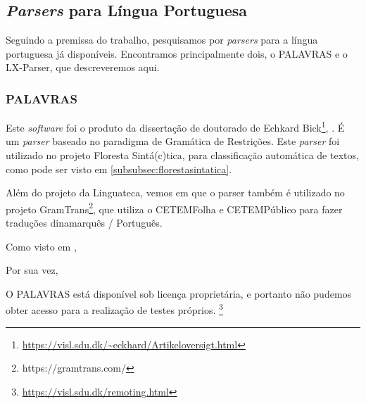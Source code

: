 \subsection{\textit{Parsers} para Língua Portuguesa}
\label{subsec:parser_portugues}
Seguindo a premissa do trabalho, pesquisamos por \textit{parsers} para a língua portuguesa já disponíveis. Encontramos principalmente dois, o PALAVRAS e o LX-Parser, que descreveremos aqui.

\subsubsection{PALAVRAS}
\label{subsubsec:palavras}

Este \textit{software} foi o produto da dissertação de doutorado de Echkard Bick\footnote{\url{https://visl.sdu.dk/~eckhard/Artikeloversigt.html}}, \cite{bick2000palavras}. É um \textit{parser} baseado no paradigma de Gramática de Restrições. Este \textit{parser} foi utilizado no projeto Floresta Sintá(c)tica, para classificação automática de textos, como pode ser visto em \ref{subsubsec:florestasintatica}.

Além do projeto da Linguateca, vemos em \cite{bick2000palavras} que o parser também é utilizado no projeto GramTrans\footnote{https://gramtrans.com/}, que utiliza o CETEMFolha e CETEMPúblico para fazer traduções dinamarquês / Português.

Como visto em \cite{linguatecaFloresta}, 
\begin{quote}
\end{quote}
Por sua vez,
\begin{quote}
\end{quote}
O PALAVRAS está disponível sob licença proprietária, e portanto não pudemos obter acesso para a realização de testes próprios. \footnote{\url{https://visl.sdu.dk/remoting.html}}

